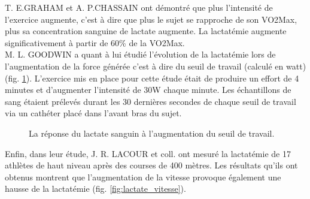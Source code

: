         T. E.GRAHAM et  A. P.CHASSAIN ont démontré que plus l'intensité de l'exercice augmente, c'est à dire que plus le sujet se rapproche de son VO2Max, plus sa concentration sanguine de lactate augmente. La lactatémie augmente significativement à partir de 60\% de la VO2Max.\\
      
       M. L. GOODWIN \cite{goodwin07} a quant à lui étudié l'évolution de la lactatémie lors de l'augmentation de la force générée c'est à dire du seuil de travail (calculé en watt) (fig. \ref{fig:lactate_work_rate}). L'exercice mis en place pour cette étude était de produire un effort de 4 minutes et d'augmenter l'intensité de 30W chaque minute. Les échantillons de sang étaient prélevés durant les 30 dernières secondes de chaque seuil de travail via un cathéter placé dans l'avant bras du sujet.\\
       
       \begin{figure}[H]
                \centering
                \caption{\label{fig:lactate_work_rate}
                La réponse du lactate sanguin à l'augmentation du seuil de travail.}
        \end{figure}
        
        
        Enfin, dans leur étude, J. R. LACOUR et coll.\cite{lacour90} ont mesuré la lactatémie de 17 athlètes de haut niveau après des courses de 400 mètres. Les résultats qu'ils ont obtenus montrent que l'augmentation de la vitesse provoque également une hausse de la lactatémie (fig. \ref{fig:lactate_vitesse}).\\
    
